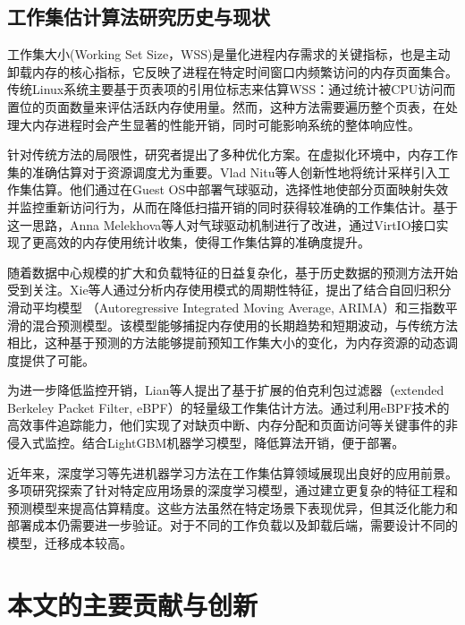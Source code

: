 \subsection{工作集估计算法研究历史与现状}
\label{sec:工作集估计算法研究历史与现状}

工作集大小(Working Set Size，WSS)是量化进程内存需求的关键指标，也是主动卸载内存的核心指标，它反映了进程在特定时间窗口内频繁访问的内存页面集合。传统Linux系统主要基于页表项的引用位标志来估算WSS：通过统计被CPU访问而置位的页面数量来评估活跃内存使用量。然而，这种方法需要遍历整个页表，在处理大内存进程时会产生显著的性能开销，同时可能影响系统的整体响应性。

针对传统方法的局限性，研究者提出了多种优化方案。在虚拟化环境中，内存工作集的准确估算对于资源调度尤为重要。Vlad Nitu等人创新性地将统计采样引入工作集估算。他们通过在Guest OS中部署气球驱动，选择性地使部分页面映射失效并监控重新访问行为，从而在降低扫描开销的同时获得较准确的工作集估计。基于这一思路，Anna Melekhova等人对气球驱动机制进行了改进，通过VirtIO接口实现了更高效的内存使用统计收集，使得工作集估算的准确度提升。

随着数据中心规模的扩大和负载特征的日益复杂化，基于历史数据的预测方法开始受到关注。Xie等人通过分析内存使用模式的周期性特征，提出了结合自回归积分滑动平均模型 （Autoregressive Integrated Moving Average, ARIMA）和三指数平滑的混合预测模型。该模型能够捕捉内存使用的长期趋势和短期波动，与传统方法相比，这种基于预测的方法能够提前预知工作集大小的变化，为内存资源的动态调度提供了可能。

为进一步降低监控开销，Lian等人提出了基于扩展的伯克利包过滤器（extended Berkeley Packet Filter, eBPF）的轻量级工作集估计方法。通过利用eBPF技术的高效事件追踪能力，他们实现了对缺页中断、内存分配和页面访问等关键事件的非侵入式监控。结合LightGBM机器学习模型，降低算法开销，便于部署。

近年来，深度学习等先进机器学习方法在工作集估算领域展现出良好的应用前景。多项研究探索了针对特定应用场景的深度学习模型，通过建立更复杂的特征工程和预测模型来提高估算精度。这些方法虽然在特定场景下表现优异，但其泛化能力和部署成本仍需要进一步验证。对于不同的工作负载以及卸载后端，需要设计不同的模型，迁移成本较高。

\section{本文的主要贡献与创新}

